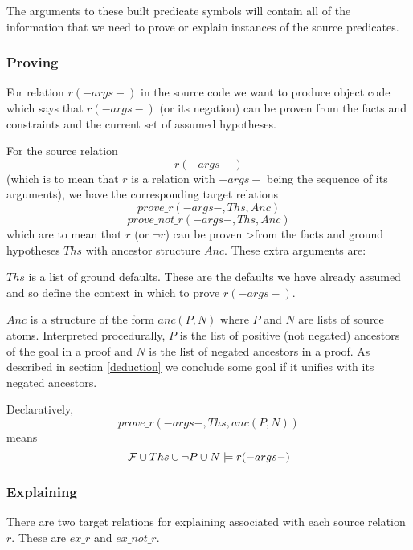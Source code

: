 The arguments to these built predicate symbols will contain all
of the information that we need to prove or explain instances of the source
predicates.
\subsubsection{Proving}
For relation $r(-args-)$ in the source code we want to produce object
code which says that $r(-args-)$ (or its negation)
can be proven from the facts and constraints and the current set
of assumed hypotheses.

For the source relation
\[r( - args -)\]
(which is to mean that $r$ is a relation with $-args-$ being the
sequence of its arguments),
we have the corresponding target relations
\[prove\_r( - args - , Ths, Anc)\]
\[prove\_not\_r( - args - , Ths, Anc)\]
which are to mean that $r$ (or $\neg r$) can be proven
>from the facts and ground hypotheses
$Ths$ with ancestor structure $Anc$.
These extra arguments are:

\begin{description}
\item $Ths$ is a list of ground defaults.
These are the defaults we have already assumed and so define the context in
which to prove $r(-args-)$.
\item $Anc$ is a structure of the form $anc(P,N)$ where $P$ and $N$ are
lists of source atoms. Interpreted procedurally,
$P$ is the list of positive (not negated) ancestors of
the goal in a proof and $N$ is the list of negated ancestors
in a proof. As described in section \ref{deduction} we conclude some goal
if it unifies with its negated ancestors.
\end{description}

Declaratively,
\[prove\_r( - args - , Ths, anc(P,N))\]
means
\[{\cal F}\cup Ths \cup \neg P \cup N \models r(-args-)\]

\subsubsection{Explaining}
There are two target relations for explaining associated with
each source relation $r$. These are $ex\_r$ and $ex\_not\_r$.


